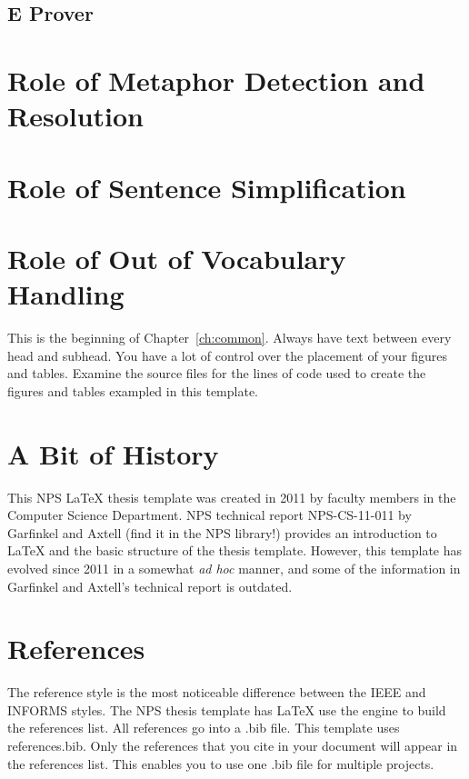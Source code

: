 \subsection{E Prover}

\section{Role of Metaphor Detection and Resolution}

\section{Role of Sentence Simplification}

\section{Role of Out of Vocabulary Handling}
This is the beginning of Chapter~\ref{ch:common}. 
Always have text between every head and subhead. You have a lot of control over the placement of your figures and tables. Examine the source files for the lines of code used to create the figures and tables exampled in this template. 

\section{A Bit of History}

This NPS \LaTeX{} thesis template was created in 2011 by faculty members in the Computer Science Department. NPS technical report NPS-CS-11-011 by Garfinkel and Axtell (find it in the NPS library!) provides an introduction to \LaTeX{} and the basic structure of the thesis template. However, this template has evolved since 2011 in a somewhat {\it ad hoc} manner, and some of the information in Garfinkel and Axtell's technical report is outdated.

\section{References}
The reference style is the most noticeable difference between the IEEE and INFORMS styles.
The NPS thesis template has \LaTeX{} use the \BibTeX{} engine to build the references list.
All references go into a .bib file.  This template uses references.bib.  Only the references that you cite in your document will appear in the references list.  This enables you to use one .bib file for multiple projects.

